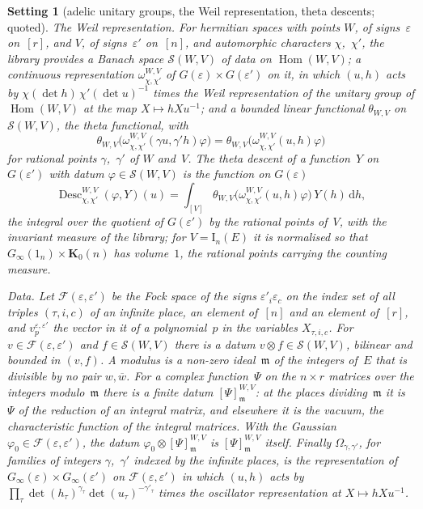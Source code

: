 \documentclass[11pt,a4paper]{article}
\newcommand{\m}[1]{\mbox{$#1$}}        %
\theoremstyle{plainx}
\theoremstyle{uprightx}
\newtheorem{setting}[theorem]{Setting}          %
\newcommand{\Ginf}[1]{G_{\infty}(#1)}
\newcommand{\Gad}[1]{G(#1)}
\newcommand{\Kz}[1]{\mathbf{K}_{0}(#1)}
\newcommand{\std}[2]{\mathrm{I}_{#2}(#1)}
\newcommand{\one}[1]{1_{#1}}
\newcommand{\Desc}[4]{\operatorname{Desc}^{#1,#2}_{#3,#4}}
\newcommand{\RPW}[2]{\Omega_{#1,#2}}
\newcommand{\FockP}[2]{\mathcal{F}(#1,#2)}
\newcommand{\pvP}[3]{v^{#1,#2}_{#3}}
\newcommand{\modD}[5]{#5\otimes[#4]^{#1,#2}_{#3}}
\newcommand{\conj}[1]{\overline{#1}}
\newcommand{\dd}{\mathrm{d}}
\begin{document}
\begin{setting}[adelic unitary groups, the Weil representation, theta descents; quoted]
\emph{The Weil representation.} For hermitian spaces with points $W$, of signs~$\varepsilon$ on~$[r]$, and $V$,
of signs~$\varepsilon'$ on~$[n]$, and automorphic characters $\chi$,~$\chi'$, the library provides a Banach
space \m{\mathcal{S}(W,V)} of \emph{data} on \m{\operatorname{Hom}(W,V)}; a continuous representation
\m{\omega^{W,V}_{\chi,\chi'}} of \m{\Gad{\varepsilon}\times\Gad{\varepsilon'}} on it, in which $(u,h)$ acts by
\m{\chi(\det h)\,\chi'(\det u)^{-1}} times the Weil representation of the unitary group of
\m{\operatorname{Hom}(W,V)} at the map \m{X\mapsto hXu^{-1}}; and a bounded linear functional
\m{\theta_{W,V}} on \m{\mathcal{S}(W,V)}, the \emph{theta functional}, with
\begin{equation}\label{e:rat}
\theta_{W,V}\bigl(\omega^{W,V}_{\chi,\chi'}(\gamma u,\gamma'h)\varphi\bigr)=\theta_{W,V}\bigl(\omega^{W,V}_{\chi,\chi'}(u,h)\varphi\bigr)
\end{equation}
for rational points $\gamma$,~$\gamma'$ of $W$ and~$V$. The \emph{theta descent} of a function~$Y$ on
\m{\Gad{\varepsilon'}} with datum \m{\varphi\in\mathcal{S}(W,V)} is the function on \m{\Gad{\varepsilon}}
\[
\Desc{W}{V}{\chi}{\chi'}(\varphi,Y)(u)=\int_{[V]}\theta_{W,V}\bigl(\omega^{W,V}_{\chi,\chi'}(u,h)\varphi\bigr)\,Y(h)\,\dd h ,
\]
the integral over the quotient of \m{\Gad{\varepsilon'}} by the rational points of~$V$, with the invariant measure
of the library; for \m{V=\std{E}{n}} it is normalised so that \m{\Ginf{\one{n}}\times\Kz{n}} has volume~$1$, the
rational points carrying the counting measure.

\emph{Data.} Let \m{\FockP{\varepsilon}{\varepsilon'}} be the Fock space of the signs
\m{\varepsilon'_{i}\varepsilon_{c}} on the index set of all triples \m{(\tau,i,c)} of an infinite place, an element
of~$[n]$ and an element of~$[r]$, and \m{\pvP{\varepsilon}{\varepsilon'}{p}} the vector in it of a polynomial~$p$
in the variables \m{X_{\tau,i,c}}. For \m{v\in\FockP{\varepsilon}{\varepsilon'}} and \m{f\in\mathcal{S}(W,V)} there is
a datum \m{v\otimes f\in\mathcal{S}(W,V)}, bilinear and bounded in \m{(v,f)}. A \emph{modulus} is a non-zero ideal~$\mathfrak{m}$ of the integers of~$E$ that is
divisible by no pair \m{w,\conj{w}}. For a complex function~$\Psi$ on the \m{n\times r} matrices over the integers
modulo~$\mathfrak{m}$ there is a \emph{finite datum} \m{[\Psi]^{W,V}_{\mathfrak{m}}}: at the places
dividing~$\mathfrak{m}$ it is~$\Psi$ of the reduction of an integral matrix, and elsewhere it is the vacuum, the
characteristic function of the integral matrices. With the Gaussian \m{\varphi_{0}\in\FockP{\varepsilon}{\varepsilon'}}, the datum
\m{\modD{W}{V}{\mathfrak{m}}{\Psi}{\varphi_{0}}} is \m{[\Psi]^{W,V}_{\mathfrak{m}}} itself. Finally
\m{\RPW{\gamma}{\gamma'}}, for families of integers $\gamma$,~$\gamma'$ indexed by the infinite places, is the
representation of \m{\Ginf{\varepsilon}\times\Ginf{\varepsilon'}} on \m{\FockP{\varepsilon}{\varepsilon'}} in which $(u,h)$ acts by
\m{\prod_{\tau}\det(h_{\tau})^{\gamma_{\tau}}\det(u_{\tau})^{-\gamma'_{\tau}}} times the oscillator representation at
\m{X\mapsto hXu^{-1}}.
\end{setting}
\end{document}
